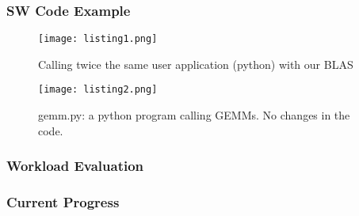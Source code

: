 \begin{frame}
	\frametitle{SW Code Example}

	\small
    \begin{figure}
        \centering
        \texttt{[image: listing1.png]}
	    \vspace{-3mm}
        \caption{Calling twice the same user application (python) with our BLAS}
    \end{figure}
	    \vspace{-2mm}

    \begin{figure}
        \centering
        \texttt{[image: listing2.png]}
	    \vspace{-3mm}
        \caption{gemm.py: a python program calling GEMMs. No changes in the code.}
    \end{figure}
	\normalsize

\end{frame}

\subsubsection{Workload Evaluation}
\begin{frame}
    \frametitle{Current Progress}

    \tableofcontents[currentsection,
                     subsectionstyle=show/shaded/hide,
                     sectionstyle=show/hide]

\end{frame}

